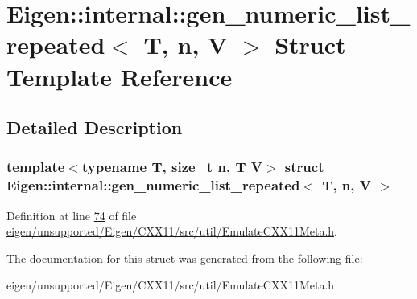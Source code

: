 \hypertarget{struct_eigen_1_1internal_1_1gen__numeric__list__repeated}{}\section{Eigen\+:\+:internal\+:\+:gen\+\_\+numeric\+\_\+list\+\_\+repeated$<$ T, n, V $>$ Struct Template Reference}
\label{struct_eigen_1_1internal_1_1gen__numeric__list__repeated}


\subsection{Detailed Description}
\subsubsection*{template$<$typename T, size\+\_\+t n, T V$>$\newline
struct Eigen\+::internal\+::gen\+\_\+numeric\+\_\+list\+\_\+repeated$<$ T, n, V $>$}



Definition at line \hyperlink{eigen_2unsupported_2_eigen_2_c_x_x11_2src_2util_2_emulate_c_x_x11_meta_8h_source_l00074}{74} of file \hyperlink{eigen_2unsupported_2_eigen_2_c_x_x11_2src_2util_2_emulate_c_x_x11_meta_8h_source}{eigen/unsupported/\+Eigen/\+C\+X\+X11/src/util/\+Emulate\+C\+X\+X11\+Meta.\+h}.



The documentation for this struct was generated from the following file\+:\begin{DoxyCompactItemize}
\item 
eigen/unsupported/\+Eigen/\+C\+X\+X11/src/util/\+Emulate\+C\+X\+X11\+Meta.\+h\end{DoxyCompactItemize}
